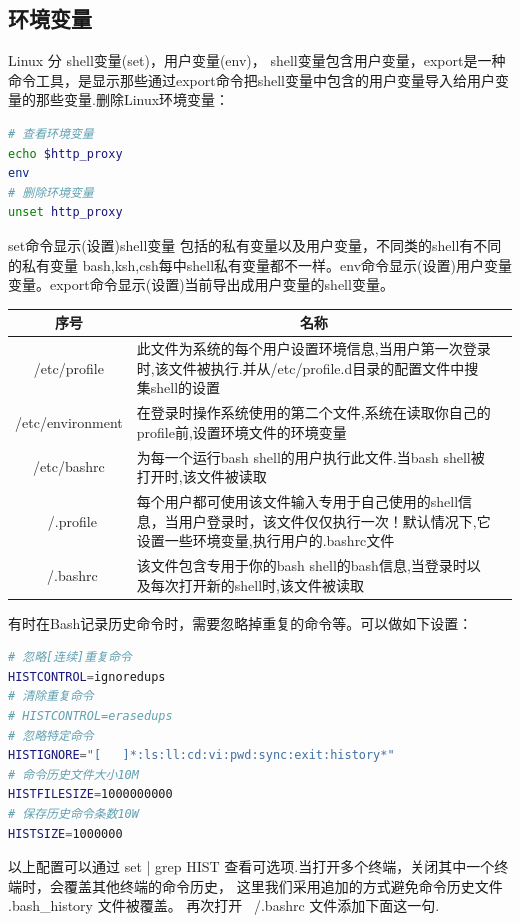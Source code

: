 \documentclass[letter]{book}
\begin{document}
\subsection{环境变量}

Linux 分 shell变量(set)，用户变量(env)， shell变量包含用户变量，export是一种命令工具，是显示那些通过export命令把shell变量中包含的用户变量导入给用户变量的那些变量.删除Linux环境变量：

\begin{lstlisting}[language=Bash]
# 查看环境变量
echo $http_proxy
env
# 删除环境变量
unset http_proxy
\end{lstlisting}

set命令显示(设置)shell变量 包括的私有变量以及用户变量，不同类的shell有不同的私有变量 bash,ksh,csh每中shell私有变量都不一样。env命令显示(设置)用户变量变量。export命令显示(设置)当前导出成用户变量的shell变量。

\begin{tabular}{cp{8cm}c}
	\hline
	\multirow{1}{*}{序号}
	& \multicolumn{1}{c}{名称}  \\
	\hline			
	/etc/profile  & 此文件为系统的每个用户设置环境信息,当用户第一次登录时,该文件被执行.并从/etc/profile.d目录的配置文件中搜集shell的设置 \\
	\hline	
	/etc/environment & 在登录时操作系统使用的第二个文件,系统在读取你自己的profile前,设置环境文件的环境变量 \\
	\hline
	/etc/bashrc & 为每一个运行bash shell的用户执行此文件.当bash shell被打开时,该文件被读取\\
	\hline
	~/.profile & 每个用户都可使用该文件输入专用于自己使用的shell信息，当用户登录时，该文件仅仅执行一次！默认情况下,它设置一些环境变量,执行用户的.bashrc文件\\
	\hline
	~/.bashrc &  该文件包含专用于你的bash shell的bash信息,当登录时以及每次打开新的shell时,该文件被读取\\
	\hline
\end{tabular}

有时在Bash记录历史命令时，需要忽略掉重复的命令等。可以做如下设置：

\begin{lstlisting}[language=Bash]
# 忽略[连续]重复命令
HISTCONTROL=ignoredups
# 清除重复命令
# HISTCONTROL=erasedups
# 忽略特定命令
HISTIGNORE="[   ]*:ls:ll:cd:vi:pwd:sync:exit:history*"
# 命令历史文件大小10M
HISTFILESIZE=1000000000
# 保存历史命令条数10W
HISTSIZE=1000000
\end{lstlisting}

以上配置可以通过 set | grep HIST 查看可选项.当打开多个终端，关闭其中一个终端时，会覆盖其他终端的命令历史， 这里我们采用追加的方式避免命令历史文件 .bash\_history 文件被覆盖。 再次打开 ~/.bashrc 文件添加下面这一句.
\end{document}
